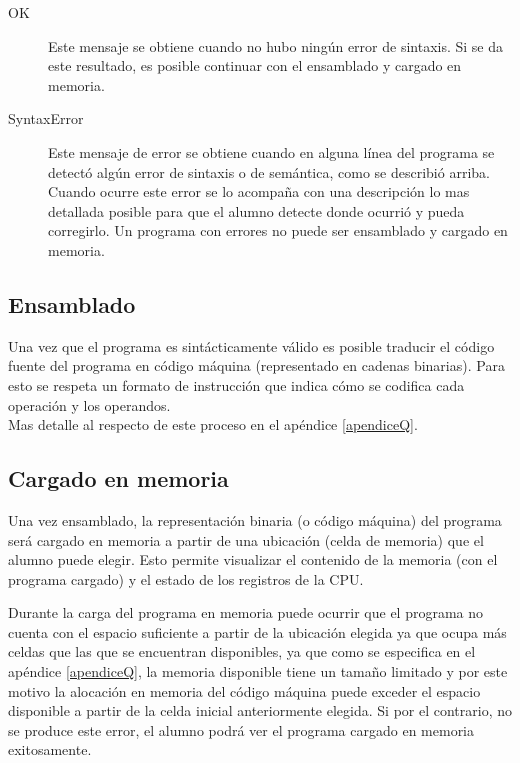 \begin{description}
\item[OK] Este mensaje se obtiene cuando no hubo ningún error de sintaxis. Si se da este resultado, es posible continuar con el ensamblado y cargado en memoria.
\item[SyntaxError] Este mensaje de error se obtiene cuando en alguna línea del programa se detectó algún error de sintaxis o de semántica, como se describió arriba. Cuando ocurre este error se lo acompaña con una descripción lo mas detallada posible para que el alumno detecte donde ocurrió y pueda corregirlo. Un programa con errores no puede ser ensamblado y cargado en memoria.
\end{description}

\subsection{Ensamblado}

Una vez que el programa es sintácticamente válido es posible traducir el código fuente del programa en código máquina (representado en cadenas binarias). Para esto se respeta un formato de instrucción que indica cómo se codifica cada operación y los operandos. \\
Mas detalle al respecto de este proceso en el apéndice \ref{apendiceQ}.

\subsection{Cargado en memoria}

Una vez ensamblado, la representación binaria (o código máquina) del programa será cargado en memoria a partir de una ubicación (celda de memoria) que el alumno puede elegir. Esto permite visualizar el contenido de la memoria (con el programa cargado) y el estado de los registros de la CPU. 

Durante la carga del programa en memoria puede ocurrir que el programa no cuenta con el espacio suficiente a partir de la ubicación elegida ya que ocupa más celdas que las que se encuentran disponibles, ya que como se especifica en el apéndice \ref{apendiceQ}, la memoria disponible tiene un tamaño limitado y por este motivo la alocación en memoria del código máquina puede exceder el espacio disponible a partir de la celda inicial anteriormente elegida. Si por el contrario, no se produce este error, el alumno podrá ver el programa cargado en memoria exitosamente.

